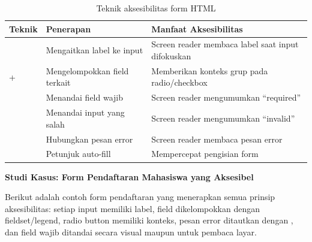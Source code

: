 \begin{table}[htbp]
\centering
\begin{tabular}{|P{3.5cm}|P{3.5cm}|P{5cm}|}
\hline
\textbf{Teknik} & \textbf{Penerapan} & \textbf{Manfaat Aksesibilitas} \\
\hline
{} & Mengaitkan label ke input & Screen reader membaca label saat input difokuskan \\
\hline
{} +  & Mengelompokkan field terkait & Memberikan konteks grup pada radio/checkbox \\
\hline
{} & Menandai field wajib & Screen reader mengumumkan ``required'' \\
\hline
{} & Menandai input yang salah & Screen reader mengumumkan ``invalid'' \\
\hline
{} & Hubungkan pesan error & Screen reader membaca pesan error \\
\hline
{} & Petunjuk auto-fill & Mempercepat pengisian form \\
\hline
\end{tabular}
\caption{Teknik aksesibilitas form HTML}
\end{table}

\begin{contoh}
\textbf{Studi Kasus: Form Pendaftaran Mahasiswa yang Aksesibel}

Berikut adalah contoh form pendaftaran yang menerapkan semua prinsip aksesibilitas: setiap input memiliki label, field dikelompokkan dengan fieldset/legend, radio button memiliki konteks, pesan error ditautkan dengan , dan field wajib ditandai secara visual maupun untuk pembaca layar.
\end{contoh}

